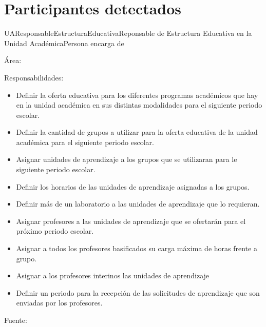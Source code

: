 \section{Participantes detectados}

\begin{actor}{UAResponsableEstructuraEducativa}{Reponsable de Estructura Educativa en la Unidad Académica}{Persona encarga de}

	\item[Área:] 
	\item[Responsabilidades:] \cdtEmpty
	\begin{itemize}
		
		
		\item Definir la oferta educativa para los diferentes programas académicos que hay en la unidad académica en sus distintas modalidades para el siguiente periodo escolar.
		\item Definir la cantidad de grupos a utilizar para la oferta educativa de la unidad académica para el siguiente periodo escolar.
		\item Asignar unidades de aprendizaje a los grupos que se utilizaran para le siguiente periodo escolar.
		\item Definir los horarios de las unidades de aprendizaje asignadas a los grupos.
		\item Definir más de un laboratorio a las unidades de aprendizaje que lo requieran.
		\item Asignar profesores a las unidades de aprendizaje que se ofertarán para el próximo periodo escolar.
		\item Asignar a todos los profesores basificados su carga máxima de horas frente a grupo.
		\item Asignar a los profesores interinos las unidades de aprendizaje 
		\item Definir un periodo para la recepción de las solicitudes de aprendizaje que son enviadas por los profesores.
		
	\end{itemize}

	\item[Fuente:]%


\end{actor}


